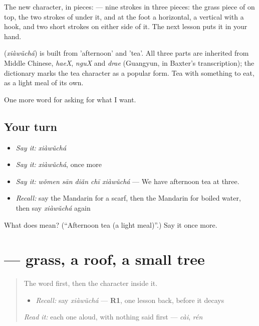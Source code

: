 The new character, in pieces:  — nine strokes in three pieces: the grass piece of  on top, the two strokes of  under it, and at the foot a horizontal, a vertical with a hook, and two short strokes on either side of it. The next lesson puts it in your hand.

\begin{cousinweb}
\textbf{} (\emph{xiàwǔchá}) is built from  'afternoon' and  'tea'. All three parts are inherited from Middle Chinese, \emph{haeX}, \emph{nguX} and \emph{drae} (Guangyun, in Baxter's transcription); the dictionary marks the tea character as a popular form. Tea with something to eat, as a light meal of its own.
\end{cousinweb}

\begin{grammarlens}[title={What you've built}]
One more word for asking for what I want.
\end{grammarlens}

\subsection*{Your turn}
\begin{itemize}
\raggedright
  \item \emph{Say it:} \emph{xiàwǔchá}
  \item \emph{Say it:} \emph{xiàwǔchá}, once more
  \item \emph{Say it:} \emph{wǒmen sān diǎn chī xiàwǔchá} — We have afternoon tea at three.
  \item \emph{Recall:} say the Mandarin for a scarf, then the Mandarin for boiled water, then say \emph{xiàwǔchá} again
\end{itemize}

\begin{tcolorbox}[breakable,colback=teal!4,colframe=teal!35!black,title={Before you move on}]
What does  mean? (\textquotedblleft{}Afternoon tea (a light meal)\textquotedblright{}.) Say it once more.
\end{tcolorbox}
\section[\texorpdfstring{\zh{茶} (chá)}{茶 (chá)}]{ — grass, a roof, a small tree}

\label{lesson:ZH-W166-cha-tea}



\begin{quote}
The word first, then the character inside it.

\begin{itemize}
\raggedright
  \item \emph{Recall:} say \emph{xiàwǔchá} — \textbf{R1}, one lesson back, before it decays
\end{itemize}

\begin{quote}
 
\end{quote}

\emph{Read it:} each one aloud, with nothing said first — \emph{cài}, \emph{rén}
\end{quote}

